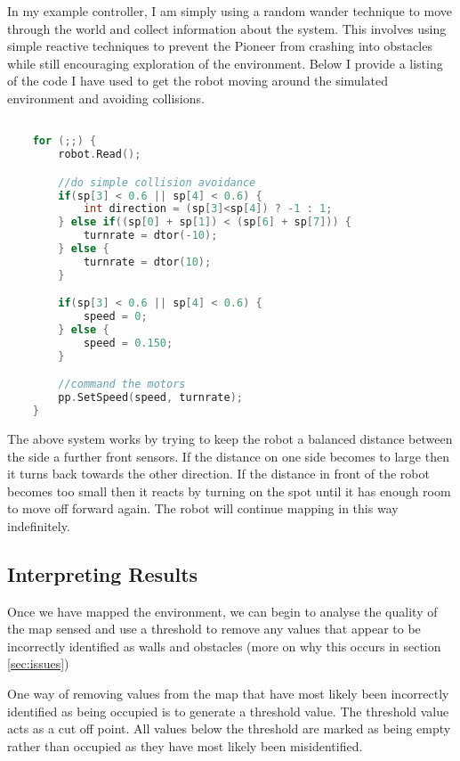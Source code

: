 \documentclass{article}
\begin{document}
In my example controller, I am simply using a random wander technique to move through the world and collect information about the system. This involves using simple reactive techniques to prevent the Pioneer from crashing into obstacles while still encouraging exploration of the environment. Below I provide a listing of the code I have used to get the robot moving around the simulated environment and avoiding collisions.

\begin{center}
	\begin{lstlisting}[language=c++, showstringspaces=false, caption={C++ code used to make control the robot to reactively wander through the environment}]

	for (;;) {
		robot.Read();

		//do simple collision avoidance
		if(sp[3] < 0.6 || sp[4] < 0.6) {
			int direction = (sp[3]<sp[4]) ? -1 : 1;
		} else if((sp[0] + sp[1]) < (sp[6] + sp[7])) {
			turnrate = dtor(-10);
		} else {
			turnrate = dtor(10);
		}

		if(sp[3] < 0.6 || sp[4] < 0.6) {
			speed = 0;
		} else {
			speed = 0.150;
		}

		//command the motors
		pp.SetSpeed(speed, turnrate);
	}

	\end{lstlisting}
\end{center}

The above system works by trying to keep the robot a balanced distance between the side a further front sensors. If the distance on one side becomes to large then it turns back towards the other direction. If the distance in front of the robot becomes too small then it reacts by turning on the spot until it has enough room to move off forward again. The robot will continue mapping in this way indefinitely.

\subsection{Interpreting Results}
Once we have mapped the environment, we can begin to analyse the quality of the map sensed and use a threshold to remove any values that appear to be incorrectly identified as walls and obstacles (more on why this occurs in section \ref{sec:issues})

One way of removing values from the map that have most likely been incorrectly identified as being occupied is to generate a threshold value. The threshold value acts as a cut off point. All values below the threshold are marked as being empty rather than occupied as they have most likely been misidentified.
\end{document}
